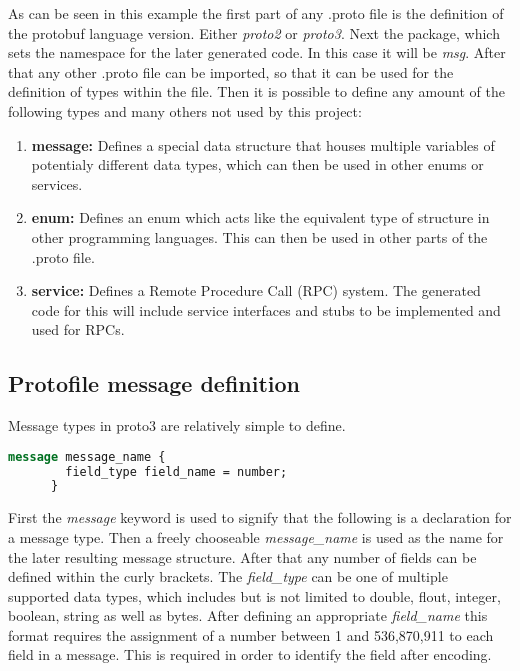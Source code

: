 As can be seen in this example the first part of any .proto file is the definition of the protobuf language version. Either \textit{proto2} or \textit{proto3}. Next the package, 
which sets the namespace for the later generated code. In this case it will be \textit{msg}. After that any other .proto file can be imported, so that it can be used for the definition of types within the file.
Then it is possible to define any amount of the following types and many others not used by this project:
\begin{enumerate}
    \item \textbf{message:} Defines a special data structure that houses multiple variables of potentialy different data types, which can then be used in other enums or services.
    \item \textbf{enum:} Defines an enum which acts like the equivalent type of structure in other programming languages. This can then be used in other parts of the .proto file.
    \item \textbf{service:} Defines a Remote Procedure Call (RPC) system. The generated code for this will include service interfaces and stubs to be implemented and used for RPCs.
\end{enumerate}

\subsection{Protofile message definition}

Message types in proto3 are relatively simple to define.

\begin{minipage}{\textwidth}
\begin{lstlisting}[language=ProtoBuf, caption=Message definition syntax in Protofiles]
    message message_name {
        field_type field_name = number;
      }
\end{lstlisting}
\end{minipage}

First the \textit{message} keyword is used to signify that the following is a declaration for a message type. Then a freely chooseable \textit{message\_name} is 
used as the name for the later resulting message structure. After that any number of fields can be defined within the curly brackets. The \textit{field\_type} can be
one of multiple supported data types, which includes but is not limited to double, flout, integer, boolean, string as well as bytes. After defining an appropriate
\textit{field\_name} this format requires the assignment of a number between 1 and 536,870,911 to each field in a message. This is required in order to identify
the field after encoding.

